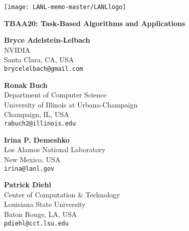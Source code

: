 \documentclass[12pt,letterpaper]{article}
\begin{document}
  \vspace*{-2cm}%
  \hspace*{-2.0cm}%
\texttt{[image: LANL-memo-master/LANLlogo]}


\begin{center}
\Large \textbf{TBAA20: Task-Based Algorithms and Applications}
\end{center}

\vspace{.75cm}

\begin{minipage}[t]{0.45\textwidth}
  \textbf{Bryce Adelstein-Lelbach}\\
  NVIDIA\\
  Santa Clara, CA, USA \\
  \texttt{brycelelbach@gmail.com}
\end{minipage}
\hfill
\begin{minipage}[t]{0.45\textwidth}
 \textbf{Ronak Buch}\\
  Department of Computer Science\\
  University of Illinois at Urbana-Champaign\\
  Champaign, IL, USA \\
  \texttt{rabuch2@illinois.edu} 
\end{minipage}

\hspace{0.25cm}

\begin{minipage}[t]{0.45\textwidth}
 \textbf{Irina P. Demeshko}\\
  Los Alamos National Laboratory\\
  New Mexico, USA \\
  \texttt{irina@lanl.gov} 
\end{minipage}
\hfill
\begin{minipage}[t]{0.45\textwidth}
 \textbf{Patrick Diehl}\\
  Center of Computation \& Technology\\
  Louisiana State University\\
  Baton Rouge, LA, USA \\
  \texttt{pdiehl@cct.lsu.edu} 
\end{minipage}

\hspace{0.25cm}
\end{document}
